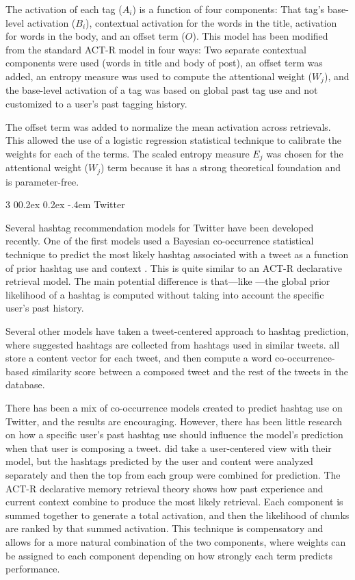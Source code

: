 \documentclass[man,floatsintext,donotrepeattitle]{apa6}
\makeatletter
\renewcommand{\subsubsection}{%
  \@startsection
  {subsubsection}%
  {3}%
  {\parindent}%
  {0\baselineskip \@plus 0.2ex \@minus 0.2ex}%
  {-.4em}%
  {\normalfont\normalsize\bfseries\addperi}}
\makeatother
\begin{document}
The activation of each tag ($A_{i}$) is a function of four components:
That tag's base-level activation ($B_{i}$), contextual activation for the words in the title, activation for words in the body, and an offset term ($O$).
This model has been modified from the standard ACT-R model in four ways:
Two separate contextual components were used (words in title and body of post), an offset term was added, an entropy measure was used to compute the attentional weight ($W_{j}$),
and the base-level activation of a tag was based on global past tag use and not customized to a user's past tagging history.

The offset term was added to normalize the mean activation across retrievals.
This allowed the use of a logistic regression statistical technique to calibrate the weights for each of the terms.
The scaled entropy measure $E_{j}$ was chosen for the attentional weight ($W_{j}$) term because it has a strong theoretical foundation \parencite{Dumais1991} and is parameter-free.

\subsubsection{Twitter}

Several hashtag recommendation models for Twitter have been developed recently.
One of the first models used a Bayesian co-occurrence statistical technique to predict the most likely hashtag associated with a tweet as a function of prior hashtag use and context \parencite{Mazzia2009}.
This is quite similar to an ACT-R declarative retrieval model.
The main potential difference is that---like \textcite{Stanley2013}---the global prior likelihood of a hashtag is computed without taking into account the specific user's past history.

Several other models have taken a tweet-centered approach to hashtag prediction, where suggested hashtags are collected from hashtags used in similar tweets.
\textcites{Li2011, Zangerle2011, Kywe2012} all store a content vector for each tweet, and then compute a word co-occurrence-based similarity score between a composed tweet and the rest of the tweets in the database.

There has been a mix of co-occurrence models created to predict hashtag use on Twitter, and the results are encouraging.
However, there has been little research on how a specific user's past hashtag use should influence the model's prediction when that user is composing a tweet.
\textcite{Kywe2012} did take a user-centered view with their model, but the hashtags predicted by the user and content were analyzed separately and then the top from each group were combined for prediction.
The ACT-R declarative memory retrieval theory shows how past experience and current context combine to produce the most likely retrieval.
Each component is summed together to generate a total activation, and then the likelihood of chunks are ranked by that summed activation.
This technique is compensatory and allows for a more natural combination of the two components, where weights can be assigned to each component depending on how strongly each term predicts performance.
\end{document}
